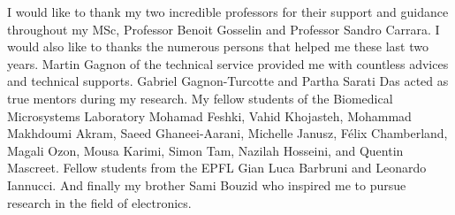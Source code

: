 I would like to thank my two incredible professors for their support and guidance throughout my MSc, Professor Benoit Gosselin and Professor Sandro Carrara. I would also like to thanks the numerous persons that helped me these last two years. Martin Gagnon of the technical service provided me with countless advices and technical supports. Gabriel Gagnon-Turcotte and Partha Sarati Das acted as true mentors during my research. My fellow students of the Biomedical Microsystems Laboratory Mohamad Feshki, Vahid Khojasteh, Mohammad Makhdoumi Akram, Saeed Ghaneei-Aarani, Michelle Janusz, Félix Chamberland, Magali Ozon, Mousa Karimi, Simon Tam, Nazilah Hosseini, and  Quentin Mascreet. Fellow students from the EPFL Gian Luca Barbruni and Leonardo Iannucci. And finally my brother Sami Bouzid who inspired me to pursue research in the field of electronics. 